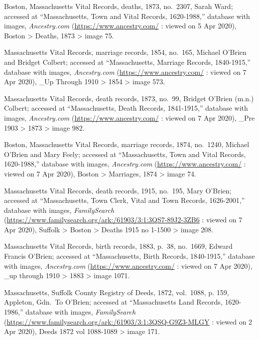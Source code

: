 \begin{thebibliography}{999}
	Boston, Massachusetts Vital Records, deaths, 1873, no.\ 2307, Sarah Ward; accessed at ``Massachusetts, Town and Vital Records, 1620-1988,'' database with images, \textit{Ancestry.com} (\url{https://www.ancestry.com/} : viewed on 5 Apr 2020), Boston > Deaths, 1873 > image 75.
	
	Massachusetts Vital Records, marriage records, 1854, no.\ 165, Michael O'Brien and Bridget Colbert; accessed at ``Massachusetts, Marriage Records, 1840-1915,'' database with images, \textit{Ancestry.com} (\url{https://www.ancestry.com/} : viewed on 7 Apr 2020), \_Up Through 1910 > 1854 > image 573.
	
	Massachusetts Vital Records, death records, 1873, no.\ 99, Bridget O'Brien (m.n.) Colbert; accessed at ``Massachusetts, Death Records, 1841-1915,'' database with images, \textit{Ancestry.com} (\url{https://www.ancestry.com/} : viewed on 7 Apr 2020), \_Pre 1903 > 1873 > image 982.
	
	Boston, Massachusetts Vital Records, marriage records, 1874, no.\ 1240, Michael O'Brien and Mary Feely; accessed at ``Massachusetts, Town and Vital Records, 1620-1988,'' database with images, \textit{Ancestry.com} (\url{https://www.ancestry.com/} : viewed on 7 Apr 2020), Boston > Marriages, 1874 > image 74.
	
	Massachusetts Vital Records, death records, 1915, no.\ 195, Mary O'Brien; accessed at ``Massachusetts, Town Clerk, Vital and Town Records, 1626-2001,'' database with images, \textit{FamilySearch} (\url{https://www.familysearch.org/ark:/61903/3:1:3QS7-89J2-3ZB6} : viewed on 7 Apr 2020), Suffolk > Boston > Deaths 1915 no 1-1500 > image 208.
	
	Massachusetts Vital Records, birth records, 1883, p.\ 38, no.\ 1669, Edward Francis O'Brien; accessed at ``Massachusetts, Birth Records, 1840-1915,'' database with images, \textit{Ancestry.com} (\url{https://www.ancestry.com/} : viewed on 7 Apr 2020), \_up through 1910 > 1883 > image 1071.
	
	Massachusetts, Suffolk County Registry of Deeds, 1872, vol.\ 1088, p. 159, Appleton, Gdn.\ To O’Brien; accessed at ``Massachusetts Land Records, 1620-1986,'' database with images, \textit{FamilySearch} (\url{https://www.familysearch.org/ark:/61903/3:1:3QSQ-G9Z3-MLGY} : viewed on 2 Apr 2020), Deeds 1872 vol 1088-1089 > image 171.
	

\end{thebibliography}
